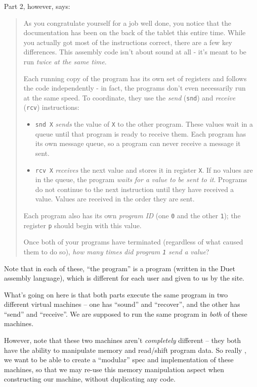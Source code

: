 \documentclass[]{article}
\begin{document}
Part 2, however, says:

\begin{quote}
As you congratulate yourself for a job well done, you notice that the
documentation has been on the back of the tablet this entire time. While you
actually got most of the instructions correct, there are a few key differences.
This assembly code isn't about sound at all - it's meant to be run \emph{twice
at the same time}.

Each running copy of the program has its own set of registers and follows the
code independently - in fact, the programs don't even necessarily run at the
same speed. To coordinate, they use the \emph{send} (\texttt{snd}) and
\emph{receive} (\texttt{rcv}) instructions:

\begin{itemize}
\tightlist
\item
  \texttt{snd\ X} \emph{sends} the value of \texttt{X} to the other program.
  These values wait in a queue until that program is ready to receive them. Each
  program has its own message queue, so a program can never receive a message it
  sent.
\item
  \texttt{rcv\ X} \emph{receives} the next value and stores it in register
  \texttt{X}. If no values are in the queue, the program \emph{waits for a value
  to be sent to it}. Programs do not continue to the next instruction until they
  have received a value. Values are received in the order they are sent.
\end{itemize}

Each program also has its own \emph{program ID} (one \texttt{0} and the other
\texttt{1}); the register \texttt{p} should begin with this value.

Once both of your programs have terminated (regardless of what caused them to do
so), \emph{how many times did program \texttt{1} send a value}?
\end{quote}

Note that in each of these, ``the program'' is a program (written in the Duet
assembly language), which is different for each user and given to us by the
site.

What's going on here is that both parts execute the same program in two
different virtual machines -- one has ``sound'' and ``recover'', and the other
has ``send'' and ``receive''. We are supposed to run the same program in
\emph{both} of these machines.

However, note that these two machines aren't \emph{completely} different -- they
both have the ability to manipulate memory and read/shift program data. So
really , we want to be able to create a ``modular'' spec and implementation of
these machines, so that we may re-use this memory manipulation aspect when
constructing our machine, without duplicating any code.
\end{document}
